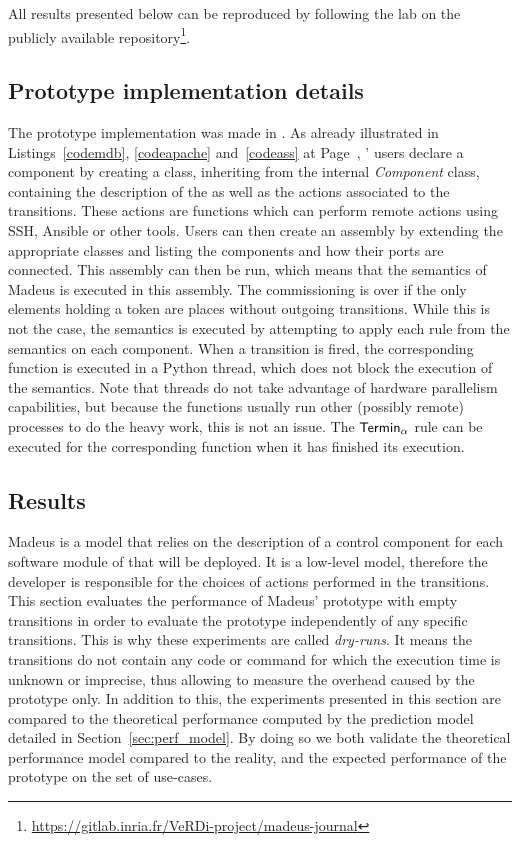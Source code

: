 All results presented below can be reproduced by following the lab on
the publicly available repository\footnote{\url{https://gitlab.inria.fr/VeRDi-project/madeus-journal}}.


\subsection{Prototype implementation details}
The prototype implementation was made in \python. As already
illustrated in Listings~\ref{codemdb}, \ref{codeapache}
and~\ref{codeass} at Page~\pageref{codemdb}, \mad' users declare a component by creating a class,
inheriting from the internal \emph{Component} class, containing the
description of the \net as well as the actions associated to the
transitions. These actions are \python functions which can perform
remote actions using SSH, Ansible or other tools. Users can then
create an assembly by extending the appropriate classes and listing the
components and how their ports are connected. This assembly can then
be run, which means that the semantics of Madeus is executed in this
assembly. The commissioning is over if the only elements holding a
token are places without outgoing transitions. While this is not the
case, the semantics is executed by attempting to apply each rule from
the semantics on each component. When a transition is fired, the
corresponding \python function is executed in a Python thread, which
does not block the execution of the semantics. Note that \python
threads do not take advantage of hardware parallelism capabilities,
but because the functions usually run other (possibly remote)
processes to do the heavy work, this is not an issue. The
$\mathsf{Termin}_\alpha$ rule can be executed for the corresponding function
when it has finished its execution.

\subsection{Results}

Madeus is a model that relies on the description of a control
component for each software module of that will be deployed. It is a
low-level model, therefore the developer is responsible for the
choices of actions performed in the transitions.  This section
evaluates the performance of Madeus' prototype with empty transitions
in order to evaluate the \mad prototype independently of any specific
transitions. This is why these experiments are called
\emph{dry-runs}. It means the transitions do not contain any code or
command for which the execution time is unknown or imprecise, thus
allowing to measure the overhead caused by the prototype only. In
addition to this, the experiments presented in this section are
compared to the theoretical performance computed by the prediction
model detailed in Section~\ref{sec:perf_model}. By doing so we both
validate the theoretical performance model compared to the reality,
and the expected performance of the prototype on the set of use-cases.

